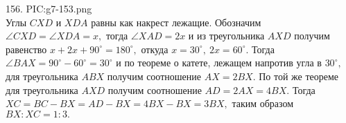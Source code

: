 156. {{PIC:g7-153.png}}\\
Углы $CXD$ и $XDA$ равны как накрест лежащие. Обозначим $\angle CXD=\angle XDA=x,$ тогда $\angle XAD=2x$ и из треугольника $AXD$ получим равенство $x+2x+90^\circ=180^\circ,$ откуда $x=30^\circ,\ 2x=60^\circ.$ Тогда $\angle BAX=90^\circ-60^\circ=30^\circ$ и по теореме о катете, лежащем напротив угла в $30^\circ,$ для треугольника $ABX$ получим соотношение $AX=2BX.$ По той же теореме для треугольника $AXD$ получим соотношение $AD=2AX=4BX.$ Тогда $XC=BC-BX=AD-BX=4BX-BX=3BX,$ таким образом $BX:XC=1:3.$\newpage\noindent
